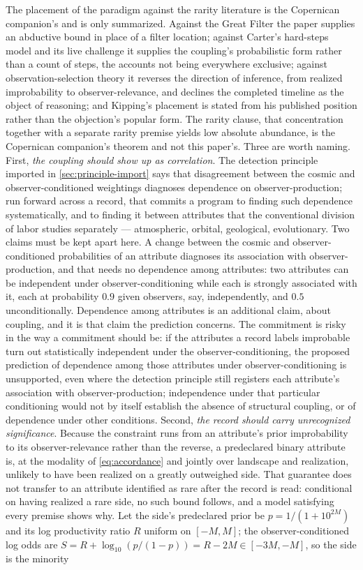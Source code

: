\documentclass[11pt]{article}
\theoremstyle{definition}
\begin{document}
The placement of the paradigm against the rarity literature is the Copernican companion's \cite{Nexus} and is only summarized. Against the Great Filter \cite{hanson1998greatfilter} the paper supplies an abductive bound in place of a filter location; against Carter's hard-steps model \cite{carter1983anthropic} and its live challenge \cite{mills2025hardsteps} it supplies the coupling's probabilistic form rather than a count of steps, the accounts not being everywhere exclusive; against observation-selection theory it reverses the direction of inference, from realized improbability to observer-relevance, and declines the completed timeline as the object of reasoning; and Kipping's placement is stated from his published position rather than the objection's popular form. The rarity clause, that concentration together with a separate rarity premise yields low absolute abundance, is the Copernican companion's theorem and not this paper's. Three are worth naming. First, \emph{the coupling should show up as correlation}. The detection principle imported in \autoref{sec:principle-import} says that disagreement between the cosmic and observer-conditioned weightings diagnoses dependence on observer-production; run forward across a record, that commits a program to finding such dependence systematically, and to finding it between attributes that the conventional division of labor studies separately --- atmospheric, orbital, geological, evolutionary. Two claims must be kept apart here. A change between the cosmic and observer-conditioned probabilities of an attribute diagnoses its association with observer-production, and that needs no dependence among attributes: two attributes can be independent under observer-conditioning while each is strongly associated with it, each at probability $0.9$ given observers, say, independently, and $0.5$ unconditionally. Dependence among attributes is an additional claim, about coupling, and it is that claim the prediction concerns. The commitment is risky in the way a commitment should be: if the attributes a record labels improbable turn out statistically independent under the observer-conditioning, the proposed prediction of dependence among those attributes under observer-conditioning is unsupported, even where the detection principle still registers each attribute's association with observer-production; independence under that particular conditioning would not by itself establish the absence of structural coupling, or of dependence under other conditions. Second, \emph{the record should carry unrecognized significance}. Because the constraint runs from an attribute's prior improbability to its observer-relevance rather than the reverse, a predeclared binary attribute is, at the modality of \eqref{eq:accordance} and jointly over landscape and realization, unlikely to have been realized on a greatly outweighed side. That guarantee does not transfer to an attribute identified as rare after the record is read: conditional on having realized a rare side, no such bound follows, and a model satisfying every premise shows why. Let the side's predeclared prior be $p = 1/(1 + 10^{2M})$ and its log productivity ratio $R$ uniform on $[-M, M]$; the observer-conditioned log odds are $S = R + \log_{10}(p/(1-p)) = R - 2M \in [-3M, -M]$, so the side is the minority 
\end{document}
